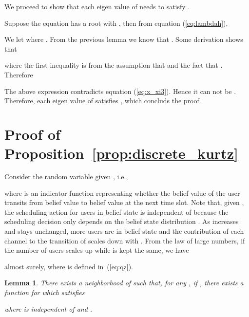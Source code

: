 \documentclass[11pt,twocolumn]{IEEEtran}
\newtheorem{lemma}{Lemma}
\begin{document}
We proceed to show that each eigen value  of  needs to satisfy .
\vspace{3pt}

Suppose the equation  has a root  with , then from equation (\ref{eq:lambdah}),


We let  where . From the previous lemma we know that . Some derivation shows that

where the first inequality is from the assumption that  and the fact that . Therefore


The above expression contradicts equation (\ref{eq:x_xi3}). Hence it can not be . Therefore, each eigen value  of  satisfies , which concluds the proof.

\section{Proof of Proposition~\ref{prop:discrete_kurtz}}
\label{appen:discrete_kurtz}
Consider the random variable  given , i.e.,

where  is an indicator function representing whether the belief value of the  user transits from belief value  to belief value  at the next time slot. Note that, given , the scheduling action for users in belief state  is independent of  because the scheduling decision only depends on the belief state distribution . As  increases and  stays unchanged, more users are in belief state  and the contribution of each channel to the transition of  scales down with . From the law of large numbers, if the number of users scales up while  is kept the same, we have

almost surely, where  is defined in~(\ref{eq:qz}).

\begin{lemma}
\label{lemma:onestep}
There exists a neighborhood  of  such that, for any , if , there exists a function  for which  satisfies

where  is independent of  and .
\end{lemma}
\end{document}
